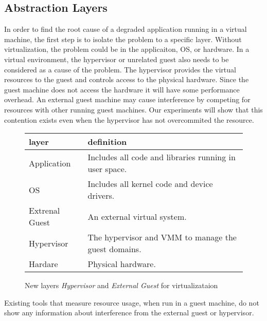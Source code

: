 \subsection{Abstraction Layers}
In order to find the root cause of a degraded application running in a virtual machine, the first step is to isolate the problem to a specific layer. Without virtualization, the problem could be in the applicaiton, OS, or hardware.  In a virtual environment, the hypervisor or unrelated guest also needs to be considered as a cause of the problem.  The hypervisor provides the virtual resources to the guest and controls access to the physical hardware.  Since the guest machine does not access the hardware it will have some performance overhead. An external guest machine may cause interference by competing for resources with other running guest machines.  Our experiments will show that this contention exists even when the hypervisor has not overcommited the resource.
\begin{figure}
\begin{tabular}{ l p{5cm} }
  layer & definition \\
  \hline
  Application & Includes all code and libraries running in user space. \\
  OS & Includes all kernel code and device drivers. \\
  Extrenal Guest & An external virtual system. \\
  Hypervisor & The hypervisor and VMM to manage the guest domains. \\
  Hardare & Physical hardware. \\
\end{tabular}
\caption{New layers \emph{Hypervisor} and \emph{External Guest} for virtualizataion}
\label{fig:layers}
\end{figure}
Existing tools that measure resource usage, when run in a guest machine, do not show any information about interference from the external guest or hypervisor. 

